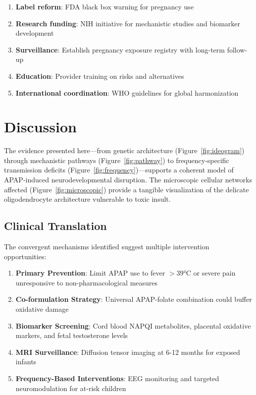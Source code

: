 \documentclass[12pt]{article}
\begin{document}
\begin{enumerate}
\item \textbf{Label reform}: FDA black box warning for pregnancy use
\item \textbf{Research funding}: NIH initiative for mechanistic studies and biomarker development
\item \textbf{Surveillance}: Establish pregnancy exposure registry with long-term follow-up
\item \textbf{Education}: Provider training on risks and alternatives
\item \textbf{International coordination}: WHO guidelines for global harmonization
\end{enumerate}

\section{Discussion}
The evidence presented here—from genetic architecture (Figure~\ref{fig:ideogram}) through mechanistic pathways (Figure~\ref{fig:pathway}) to frequency-specific transmission deficits (Figure~\ref{fig:frequency})—supports a coherent model of APAP-induced neurodevelopmental disruption. The microscopic cellular networks affected (Figure~\ref{fig:microscopic}) provide a tangible visualization of the delicate oligodendrocyte architecture vulnerable to toxic insult.

\subsection{Clinical Translation}
The convergent mechanisms identified suggest multiple intervention opportunities:
\begin{enumerate}
\item \textbf{Primary Prevention}: Limit APAP use to fever $>$39°C or severe pain unresponsive to non-pharmacological measures
\item \textbf{Co-formulation Strategy}: Universal APAP-folate combination could buffer oxidative damage
\item \textbf{Biomarker Screening}: Cord blood NAPQI metabolites, placental oxidative markers, and fetal testosterone levels
\item \textbf{MRI Surveillance}: Diffusion tensor imaging at 6-12 months for exposed infants
\item \textbf{Frequency-Based Interventions}: EEG monitoring and targeted neuromodulation for at-risk children
\end{enumerate}
\end{document}
